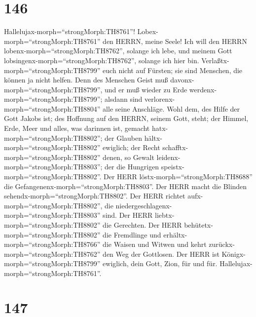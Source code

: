 \hypertarget{section-145}{%
\section{146}\label{section-145}}

 Hallelujax-morph=``strongMorph:TH8761''!
Lobex-morph=``strongMorph:TH8761'' den HERRN, meine Seele! 
Ich will den HERRN lobenx-morph=``strongMorph:TH8762'', solange ich
lebe, und meinem Gott lobsingenx-morph=``strongMorph:TH8762'', solange
ich hier bin.  Verlaßtx-morph=``strongMorph:TH8799'' euch
nicht auf Fürsten; sie sind Menschen, die können ja nicht helfen.
 Denn des Menschen Geist muß
davonx-morph=``strongMorph:TH8799'', und er muß wieder zu Erde
werdenx-morph=``strongMorph:TH8799''; alsdann sind
verlorenx-morph=``strongMorph:TH8804'' alle seine Anschläge.
 Wohl dem, des Hilfe der Gott Jakobs ist; des Hoffnung auf
den HERRN, seinem Gott, steht;  der Himmel, Erde, Meer und
alles, was darinnen ist, gemacht hatx-morph=``strongMorph:TH8802''; der
Glauben hältx-morph=``strongMorph:TH8802'' ewiglich;  der
Recht schafftx-morph=``strongMorph:TH8802'' denen, so Gewalt
leidenx-morph=``strongMorph:TH8803''; der die Hungrigen
speistx-morph=``strongMorph:TH8802''. Der HERR
löstx-morph=``strongMorph:TH8688'' die
Gefangenenx-morph=``strongMorph:TH8803''.  Der HERR macht
die Blinden sehendx-morph=``strongMorph:TH8802''. Der HERR richtet
aufx-morph=``strongMorph:TH8802'', die
niedergeschlagenx-morph=``strongMorph:TH8803'' sind. Der HERR
liebtx-morph=``strongMorph:TH8802'' die Gerechten.  Der HERR
behütetx-morph=``strongMorph:TH8802'' die Fremdlinge und
erhältx-morph=``strongMorph:TH8766'' die Waisen und Witwen und kehrt
zurückx-morph=``strongMorph:TH8762'' den Weg der Gottlosen.
 Der HERR ist Königx-morph=``strongMorph:TH8799'' ewiglich,
dein Gott, Zion, für und für. Hallelujax-morph=``strongMorph:TH8761''.

\hypertarget{section-146}{%
\section{147}\label{section-146}}

